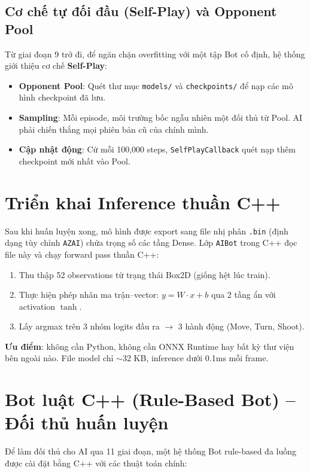 \documentclass[a4paper, 12pt]{report}
\begin{document}
  \subsection{Cơ chế tự đối đầu (Self-Play) và Opponent Pool}

  Từ giai đoạn 9 trở đi, để ngăn chặn overfitting với một tập Bot cố định, hệ thống giới thiệu cơ chế \textbf{Self-Play}:
  \begin{itemize}
    \item \textbf{Opponent Pool}: Quét thư mục \texttt{models/} và \texttt{checkpoints/} để nạp các mô hình checkpoint đã lưu.
    \item \textbf{Sampling}: Mỗi episode, môi trường bốc ngẫu nhiên một đối thủ từ Pool. AI phải chiến thắng mọi phiên bản cũ của chính mình.
    \item \textbf{Cập nhật động}: Cứ mỗi 100,000 steps, \texttt{SelfPlayCallback} quét nạp thêm checkpoint mới nhất vào Pool.
  \end{itemize}

  \section{Triển khai Inference thuần C++}

  Sau khi huấn luyện xong, mô hình được export sang file nhị phân \texttt{.bin} (định dạng tùy chỉnh \texttt{AZAI}) chứa trọng số các tầng Dense. Lớp \texttt{AIBot} trong C++ đọc file này và chạy forward pass thuần C++:

  \begin{enumerate}
    \item Thu thập 52 observations từ trạng thái Box2D (giống hệt lúc train).
    \item Thực hiện phép nhân ma trận--vector: $y = W \cdot x + b$ qua 2 tầng ẩn với activation $\tanh$.
    \item Lấy argmax trên 3 nhóm logits đầu ra $\rightarrow$ 3 hành động (Move, Turn, Shoot).
  \end{enumerate}

  \textbf{Ưu điểm}: không cần Python, không cần ONNX Runtime hay bất kỳ thư viện bên ngoài nào. File model chỉ $\sim$32 KB, inference dưới 0.1ms mỗi frame.

  \section{Bot luật C++ (Rule-Based Bot) -- Đối thủ huấn luyện}

  Để làm đối thủ cho AI qua 11 giai đoạn, một hệ thống Bot rule-based đa luồng được cài đặt bằng C++ với các thuật toán chính:
\end{document}
